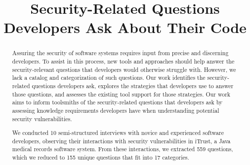 \documentclass[conference]{IEEEtran}
\begin{document}
%
\title{Security-Related Questions Developers Ask About Their Code}


\author{
}



\maketitle

\begin{abstract}

Assuring the security of software systems requires input from precise and discerning developers.
To assist in this process, new tools and approaches should help answer the security-relevant questions that developers would otherwise struggle with. 
However, we lack a catalog and categorization of such questions. Our work identifies the security-related questions developers ask, explores the strategies that developers use to answer those questions, and assesses the existing tool support for those strategies.  
Our work aims to inform toolsmiths of the security-related questions that developers ask by assessing knowledge requirements developers have when understanding potential security vulnerabilities.

We conducted 10 semi-structured interviews with novice and experienced software developers, observing their interactions with security vulnerabilities in iTrust, a Java medical records software system.
From these interactions, we extracted 559 questions, which we reduced to 155 unique questions that fit into 17 categories.


\end{abstract}

%
\IEEEpeerreviewmaketitle
\end{document}
